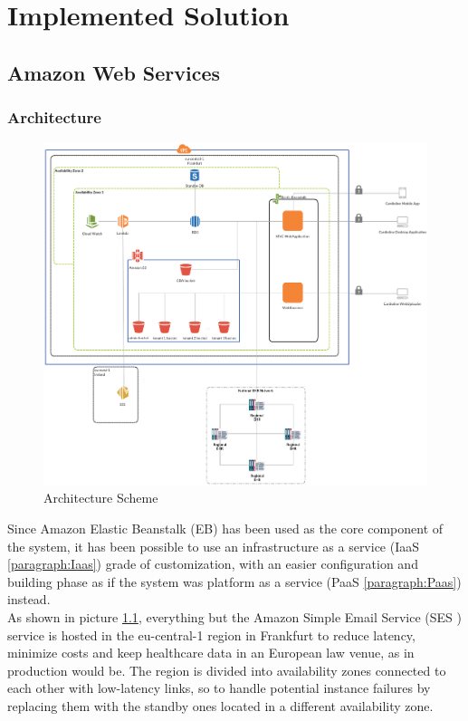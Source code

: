 \chapter{Implemented Solution}
\section{Amazon Web Services}

\subsection{Architecture}
\begin{figure}[h]
    \includegraphics[width=\textwidth]{img/architecture}
    \caption{Architecture Scheme}
    \label{fig:architecture}
\end{figure}
Since Amazon Elastic Beanstalk (EB) has been used as the core component of the system, it has been possible to use an infrastructure as a service (IaaS \ref{paragraph:Iaas}) grade of customization, with an easier configuration and building phase as if the system was platform as a service (PaaS \ref{paragraph:Paas}) instead.\\
As shown in picture \ref{fig:architecture}, everything but the Amazon Simple Email Service (SES \cite{AmazonSes}) service is hosted in the eu-central-1 region in Frankfurt to reduce latency, minimize costs and keep healthcare data in an European law venue, as in production would be.
The region is divided into availability zones connected to each other with low-latency links, so to handle potential instance failures by replacing them with the standby ones located in a different availability zone.\\
